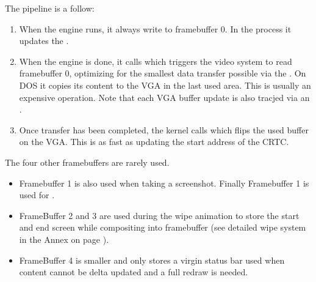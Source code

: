 \par
The pipeline is a follow:
\begin{enumerate}
\item When the engine runs, it always write to framebuffer 0. In the process it updates the .
\item When the engine is done, it calls  which triggers the video system to read framebuffer 0, optimizing for the smallest data transfer possible via the . On DOS it copies its content to the VGA in the last used area. This is usually an expensive operation. Note that each VGA buffer update is also tracjed via an .
\item Once transfer has been completed, the kernel calls   which flips the used buffer on the VGA. This is as fast as updating the start address of the CRTC.
\end{enumerate}
\par
The four other framebuffers are rarely used.
\begin{itemize} 
\item Framebuffer 1 is also used when taking a screenshot. Finally Framebuffer 1 is used for .

\item FrameBuffer 2 and 3 are used during the wipe animation to store the start and end screen while compositing into framebuffer (see detailed wipe system in the Annex on page \pageref{label_melt}). 
\item FrameBuffer 4 is smaller and only stores a virgin status bar used when content cannot be delta updated and a full redraw is needed. 
\end{itemize}
\par

\\
\par
{}
\par
\par
{}
\par